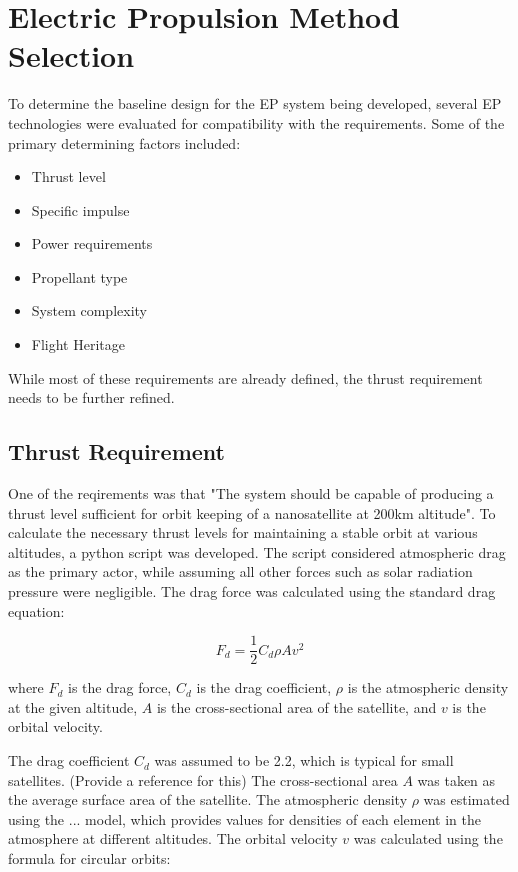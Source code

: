 \chapter{Electric Propulsion Method Selection}

To determine the baseline design for the \ac{EP} system being developed, several EP technologies were evaluated for compatibility with the requirements. Some of the primary determining factors included:

\begin{itemize}
    \item Thrust level
    \item Specific impulse
    \item Power requirements
    \item Propellant type
    \item System complexity
    \item Flight Heritage
\end{itemize}

While most of these requirements are already defined, the thrust requirement needs to be further refined.

\section{Thrust Requirement}
One of the reqirements was that "The system should be capable of producing a thrust level sufficient for orbit keeping of a nanosatellite at 200km altitude". To calculate the necessary thrust levels for maintaining a stable orbit at various altitudes, a python script was developed. The script considered atmospheric drag as the primary actor, while assuming all other forces such as solar radiation pressure were negligible. The drag force was calculated using the standard drag equation:

\begin{equation}
    F_d = \frac{1}{2} C_d \rho A v^2
\end{equation}

where \( F_d \) is the drag force, \( C_d \) is the drag coefficient, \( \rho \) is the atmospheric density at the given altitude, \( A \) is the cross-sectional area of the satellite, and \( v \) is the orbital velocity.

The drag coefficient \( C_d \) was assumed to be 2.2, which is typical for small satellites. (Provide a reference for this) 
The cross-sectional area \( A \) was taken as the average surface area of the satellite.
The atmospheric density \( \rho \) was estimated using the ... model, which provides values for densities of each element in the atmosphere at different altitudes.
The orbital velocity \( v \) was calculated using the formula for circular orbits:

